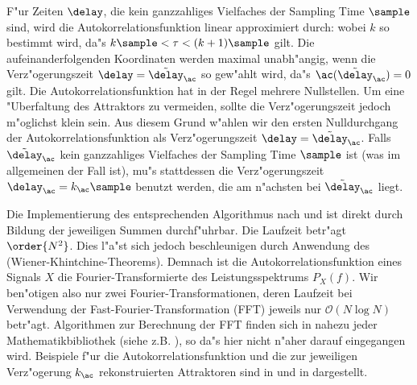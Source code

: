 F"ur Zeiten $\delay$, die kein ganzzahliges Vielfaches der Sampling Time $\sample$ sind,
wird die Autokorrelationsfunktion linear approximiert durch:
wobei $k$ so bestimmt wird, da"s $k\sample<\tau<(k+1)\sample$ gilt.  Die
aufeinanderfolgenden Koordinaten werden maximal unabh"angig, wenn die Verz"ogerungszeit
$\delay=\tilde\delay_\ac$ so gew"ahlt wird, da"s $\ac(\tilde\delay_\ac)=0$ gilt.  Die
Autokorrelationsfunktion hat in der Regel mehrere Nullstellen. Um eine "Uberfaltung des
Attraktors zu vermeiden, sollte die Verz"ogerungszeit jedoch m"oglichst klein sein.  Aus
diesem Grund w"ahlen wir den ersten Nulldurchgang der Autokorrelationsfunktion als
Verz"ogerungszeit $\delay=\tilde\delay_\ac$.  Falls $\tilde\delay_\ac$ kein ganzzahliges Vielfaches
der Sampling Time $\sample$ ist (was im allgemeinen  der Fall ist), mu"s stattdessen die Verz"ogerungszeit
$\delay_\ac=k_\ac\sample$ benutzt werden, die am n"achsten bei $\tilde\delay_\ac$ liegt.

Die Implementierung des entsprechenden Algorithmus nach  und
 ist direkt durch Bildung der jeweiligen Summen durchf"uhrbar. Die Laufzeit
betr"agt $\order{N^2}$. Dies l"a"st sich jedoch beschleunigen durch Anwendung des
\begriff(Wiener-Khintchine-Theorems). Demnach ist die Autokorrelationsfunktion eines
Signals $X$ die Fourier-Transformierte des Leistungsspektrums $P_X(f)$. Wir ben"otigen
also nur zwei Fourier-Transformationen, deren Laufzeit bei Verwendung der
Fast-Fourier-Transformation (FFT) jeweils nur \linebreak[4]  $\mathcal{O}(N\log N)$  betr"agt.  Algorithmen zur
Berechnung 
der FFT finden sich in nahezu jeder Mathematikbibliothek (siehe z.B. \cite{Numerical-recipes}), so da"s
hier nicht n"aher darauf eingegangen wird. Beispiele f"ur die
Autokorrelationsfunktion und die zur jeweiligen Verz"ogerung $k_\ac$ rekonstruierten
Attraktoren sind in  und in   dargestellt.  


